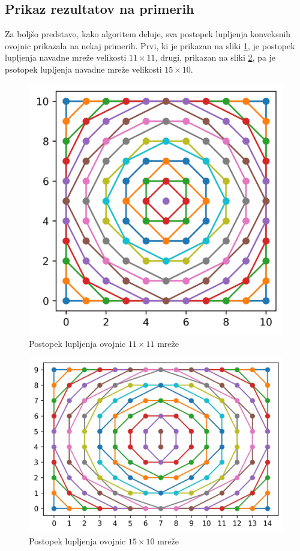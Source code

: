 \documentclass[a4paper]{article}
\begin{document}
\newpage
\subsection{Prikaz rezultatov na primerih}
Za boljšo predstavo, kako algoritem deluje, sva postopek lupljenja konveksnih ovojnic prikazala na nekaj primerih. Prvi, ki je prikazan na sliki \ref{fig:11x11}, je postopek lupljenja 
navadne mreže velikosti $11 \times 11$, drugi, prikazan na sliki \ref{fig:15x10}, pa je psotopek lupljenja navadne mreže velikosti $15 \times 10$. 

\begin{figure}[!h]
	\centering
	\caption{Postopek lupljenja ovojnic $11 \times 11$ mreže}
	\label{fig:11x11}
	\includegraphics[scale=0.5]{slike/11x11_enakomerna.png}
\end{figure}

\begin{figure}[!h]
	\centering
	\caption{Postopek lupljenja ovojnic $15 \times 10$ mreže}
	\label{fig:15x10}
	\includegraphics[scale=0.5]{slike/15x10_enakomerna.jpg}
\end{figure}
\end{document}
